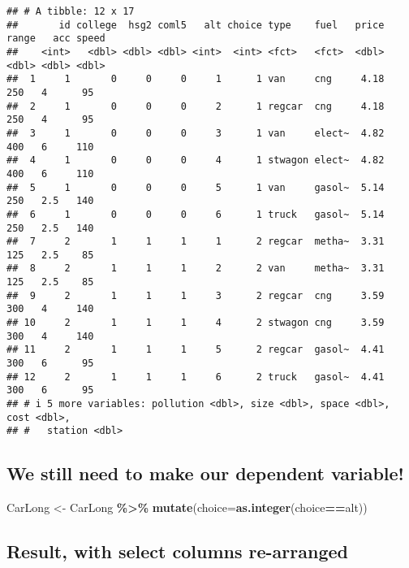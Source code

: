 \documentclass[
  11pt,
]{article}
\newenvironment{Shaded}{\begin{snugshade}}{\end{snugshade}}
\newcommand{\AttributeTok}[1]{\textcolor[rgb]{0.13,0.29,0.53}{#1}}
\newcommand{\FunctionTok}[1]{\textcolor[rgb]{0.13,0.29,0.53}{\textbf{#1}}}
\newcommand{\NormalTok}[1]{#1}
\newcommand{\OtherTok}[1]{\textcolor[rgb]{0.56,0.35,0.01}{#1}}
\newcommand{\SpecialCharTok}[1]{\textcolor[rgb]{0.81,0.36,0.00}{\textbf{#1}}}
\begin{document}
\footnotesize

\begin{verbatim}
## # A tibble: 12 x 17
##       id college  hsg2 coml5   alt choice type    fuel   price range   acc speed
##    <int>   <dbl> <dbl> <dbl> <int>  <int> <fct>   <fct>  <dbl> <dbl> <dbl> <dbl>
##  1     1       0     0     0     1      1 van     cng     4.18   250   4      95
##  2     1       0     0     0     2      1 regcar  cng     4.18   250   4      95
##  3     1       0     0     0     3      1 van     elect~  4.82   400   6     110
##  4     1       0     0     0     4      1 stwagon elect~  4.82   400   6     110
##  5     1       0     0     0     5      1 van     gasol~  5.14   250   2.5   140
##  6     1       0     0     0     6      1 truck   gasol~  5.14   250   2.5   140
##  7     2       1     1     1     1      2 regcar  metha~  3.31   125   2.5    85
##  8     2       1     1     1     2      2 van     metha~  3.31   125   2.5    85
##  9     2       1     1     1     3      2 regcar  cng     3.59   300   4     140
## 10     2       1     1     1     4      2 stwagon cng     3.59   300   4     140
## 11     2       1     1     1     5      2 regcar  gasol~  4.41   300   6      95
## 12     2       1     1     1     6      2 truck   gasol~  4.41   300   6      95
## # i 5 more variables: pollution <dbl>, size <dbl>, space <dbl>, cost <dbl>,
## #   station <dbl>
\end{verbatim}

\normalsize

\hypertarget{we-still-need-to-make-our-dependent-variable}{%
\subsection{We still need to make our dependent
variable!}\label{we-still-need-to-make-our-dependent-variable}}

\begin{Shaded}
\begin{Highlighting}[]
\NormalTok{CarLong }\OtherTok{\textless{}{-}}\NormalTok{ CarLong }\SpecialCharTok{\%\textgreater{}\%} 
  \FunctionTok{mutate}\NormalTok{(}\AttributeTok{choice=}\FunctionTok{as.integer}\NormalTok{(choice}\SpecialCharTok{==}\NormalTok{alt))}
\end{Highlighting}
\end{Shaded}

\hypertarget{result-with-select-columns-re-arranged}{%
\subsection{Result, with select columns
re-arranged}\label{result-with-select-columns-re-arranged}}
\end{document}
